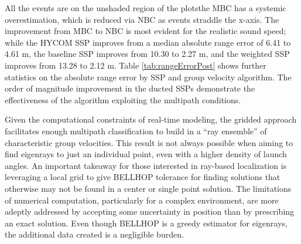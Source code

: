 All the events are on the unshaded region of the plots\textemdash the MBC has a systemic overestimation, which is reduced via NBC as events straddle the x-axis.
The improvement from MBC to NBC is most evident for the realistic sound speed; while the HYCOM SSP improves from a median absolute range error of 6.41 to 4.61 m, the baseline SSP improves from 10.30 to 2.27 m, and the weighted SSP improves from 13.28 to 2.12 m.
Table \ref{tab:rangeErrorPost} shows further statistics on the absolute range error by SSP and group velocity algorithm.
The order of magnitude improvement in the ducted SSPs demonstrate the effectiveness of the algorithm exploiting the multipath conditions.

Given the computational constraints of real-time modeling, the gridded approach facilitates enough multipath classification to build in a ``ray ensemble'' of characteristic group velocities.
This result is not always possible when aiming to find eigenrays to just an individual point, even with a higher density of launch angles.
An important takeaway for those interested in ray-based localization is leveraging a local grid to give BELLHOP tolerance for finding solutions that otherwise may not be found in a center or single point solution.
The limitations of numerical computation, particularly for a complex environment, are more adeptly addressed by accepting some uncertainty in position than by prescribing an exact solution.
Even though BELLHOP is a greedy estimator for eigenrays, the additional data created is a negligible burden. 

